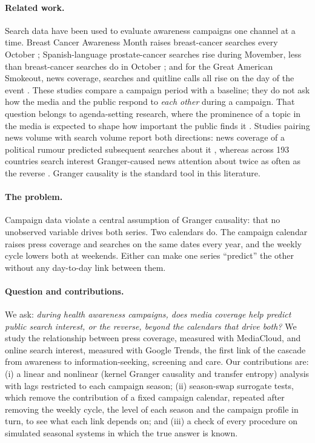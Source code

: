 \documentclass[11pt,a4paper]{article}
\begin{document}
\paragraph{Related work.} Search data have been used to evaluate awareness campaigns one channel at a time. Breast Cancer Awareness Month raises breast-cancer searches every October \cite{glynn2011}; Spanish-language prostate-cancer searches rise during Movember, less than breast-cancer searches do in October \cite{gonzalezpadilla2021}; and for the Great American Smokeout, news coverage, searches and quitline calls all rise on the day of the event \cite{ayers2016}. These studies compare a campaign period with a baseline; they do not ask how the media and the public respond to \emph{each other} during a campaign. That question belongs to agenda-setting research, where the prominence of a topic in the media is expected to shape how important the public finds it \cite{mccombs1972}. Studies pairing news volume with search volume report both directions: news coverage of a political rumour predicted subsequent searches about it \cite{weeks2010}, whereas across 193 countries search interest Granger-caused news attention about twice as often as the reverse \cite{kwak2018}. Granger causality \cite{granger1969} is the standard tool in this literature.

\paragraph{The problem.} Campaign data violate a central assumption of Granger causality: that no unobserved variable drives both series. Two calendars do. The campaign calendar raises press coverage and searches on the same dates every year, and the weekly cycle lowers both at weekends. Either can make one series ``predict'' the other without any day-to-day link between them.

\paragraph{Question and contributions.} We ask: \emph{during health awareness campaigns, does media coverage help predict public search interest, or the reverse, beyond the calendars that drive both?} We study the relationship between press coverage, measured with MediaCloud, and online search interest, measured with Google Trends, the first link of the cascade from awareness to information-seeking, screening and care. Our contributions are: (i) a linear and nonlinear (kernel Granger causality and transfer entropy) analysis with lags restricted to each campaign season; (ii) season-swap surrogate tests, which remove the contribution of a fixed campaign calendar, repeated after removing the weekly cycle, the level of each season and the campaign profile in turn, to see what each link depends on; and (iii) a check of every procedure on simulated seasonal systems in which the true answer is known.
\end{document}
